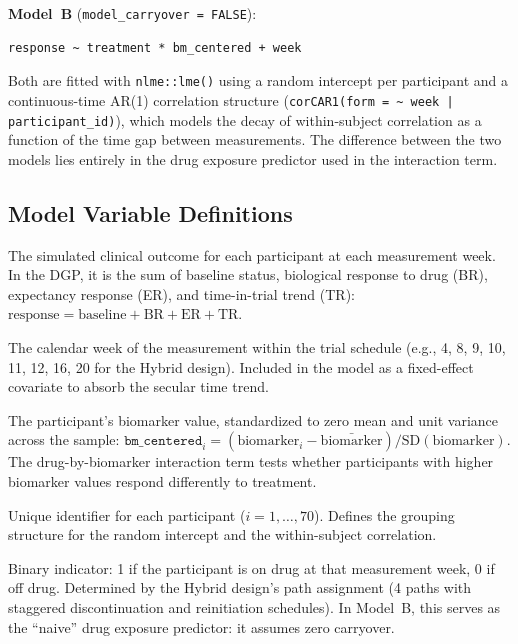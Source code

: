 \documentclass[11pt]{article}
\begin{document}
\noindent\textbf{Model~B} (\texttt{model\_carryover = FALSE}):
\begin{verbatim}
response ~ treatment * bm_centered + week
\end{verbatim}

Both are fitted with \texttt{nlme::lme()} using a random intercept
per participant and a continuous-time AR(1) correlation structure
(\texttt{corCAR1(form = \~{} week | participant\_id)}), which models
the decay of within-subject correlation as a function of the time gap
between measurements. The difference between the two models lies
entirely in the drug exposure predictor used in the interaction term.

\subsection{Model Variable Definitions}

\begin{description}[style=nextline, leftmargin=2em]
  \item[\texttt{response}]
    The simulated clinical outcome for each participant at each
    measurement week. In the DGP, it is the sum of baseline status,
    biological response to drug (BR), expectancy response (ER), and
    time-in-trial trend (TR):
    $\text{response} = \text{baseline} + \text{BR} + \text{ER}
    + \text{TR}$.

  \item[\texttt{week}]
    The calendar week of the measurement within the trial schedule
    (e.g., 4, 8, 9, 10, 11, 12, 16, 20 for the Hybrid design).
    Included in the model as a fixed-effect covariate to absorb the
    secular time trend.

  \item[\texttt{bm\_centered}]
    The participant's biomarker value, standardized to zero mean and
    unit variance across the sample:
    $\texttt{bm\_centered}_i
    = (\text{biomarker}_i - \bar{\text{biomarker}})
    / \text{SD}(\text{biomarker})$.
    The drug-by-biomarker interaction term tests whether participants
    with higher biomarker values respond differently to treatment.

  \item[\texttt{participant\_id}]
    Unique identifier for each participant ($i = 1, \ldots, 70$).
    Defines the grouping structure for the random intercept and the
    within-subject correlation.

  \item[\texttt{treatment}]
    Binary indicator: 1 if the participant is on drug at that
    measurement week, 0 if off drug. Determined by the Hybrid design's
    path assignment (4 paths with staggered discontinuation and
    reinitiation schedules). In Model~B, this serves as the ``naive''
    drug exposure predictor: it assumes zero carryover.
\end{description}
\end{document}

